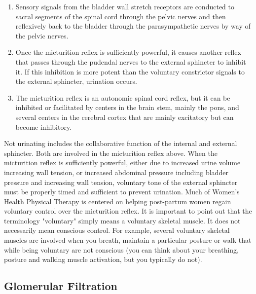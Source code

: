 \begin{enumerate}
    \item Sensory signals from the bladder wall stretch receptors are conducted to sacral segments of the spinal cord through the pelvic nerves and then reflexively back to the bladder through the parasympathetic nerves by way of the pelvic nerves.
    \item  Once the micturition reflex is sufficiently powerful, it causes another reflex that passes through the pudendal nerves to the external sphincter to inhibit it. If this inhibition is more potent than the voluntary constrictor signals to the external sphincter, urination occurs.
    \item  The micturition reflex is an autonomic spinal cord reflex, but it can be inhibited or facilitated by centers in the brain stem, mainly the pons, and several centers in the cerebral cortex that are mainly excitatory but can become inhibitory.
\end{enumerate}

Not urinating includes the collaborative function of the internal and external sphincter. Both are involved in the micturition reflex above. When the micturition reflex is sufficiently powerful, either due to increased urine volume increasing wall tension, or increased abdominal pressure including bladder pressure and increasing wall tension, voluntary tone of the external sphincter must be properly timed and sufficient to prevent urination. Much of Women's Health Physical Therapy is centered on helping post-partum women regain voluntary control over the micturition reflex. It is important to point out that the terminology "voluntary" simply means a voluntary skeletal muscle. It does not necessarily mean conscious control. For example, several voluntary skeletal muscles are involved when you breath, maintain a particular posture or walk that while being voluntary are not conscious (you can think about your breathing, posture and walking muscle activation, but you typically do not).


\subsection{Glomerular Filtration}

